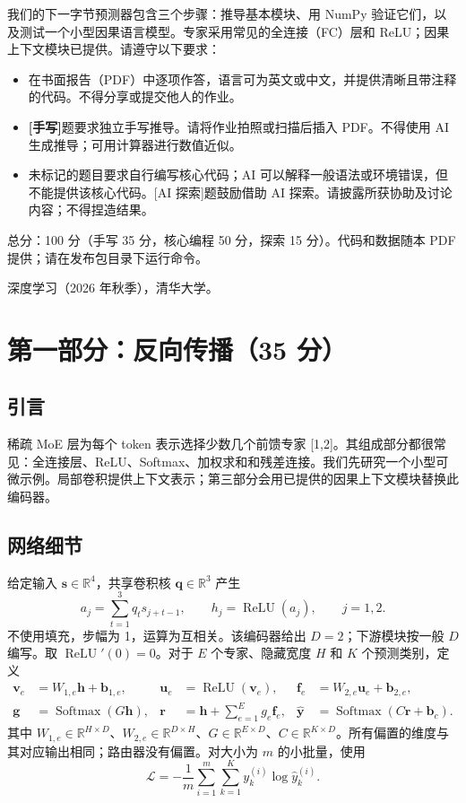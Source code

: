 \documentclass[UTF8,11pt,oneside]{ctexart}
\newcommand{\R}{\mathbb{R}}
\newcommand{\relu}{\operatorname{ReLU}}
\newcommand{\softmax}{\operatorname{Softmax}}
\newcommand{\Lcal}{\mathcal{L}}
\begin{document}
我们的下一字节预测器包含三个步骤：推导基本模块、用 NumPy 验证它们，以及测试一个小型因果语言模型。专家采用常见的全连接（FC）层和 ReLU；因果上下文模块已提供。请遵守以下要求：
\begin{itemize}
\item 在书面报告（PDF）中逐项作答，语言可为英文或中文，并提供清晰且带注释的代码。不得分享或提交他人的作业。
\item \textbf{[手写]}题要求独立手写推导。请将作业拍照或扫描后插入 PDF。不得使用 AI 生成推导；可用计算器进行数值近似。
\item 未标记的题目要求自行编写核心代码；AI 可以解释一般语法或环境错误，但不能提供该核心代码。[AI 探索]题鼓励借助 AI 探索。请披露所获协助及讨论内容；不得捏造结果。
\end{itemize}
总分：100 分（手写 35 分，核心编程 50 分，探索 15 分）。代码和数据随本 PDF 提供；请在发布包目录下运行命令。

\begin{center}\small 深度学习（2026 年秋季），清华大学。\end{center}

\clearpage
\section{第一部分：反向传播（35 分）}
\subsection{引言}
稀疏 MoE 层为每个 token 表示选择少数几个前馈专家 [1,2]。其组成部分都很常见：全连接层、ReLU、Softmax、加权求和和残差连接。我们先研究一个小型可微示例。局部卷积提供上下文表示；第三部分会用已提供的因果上下文模块替换此编码器。

\subsection{网络细节}
给定输入 $\bm{s}\in\R^4$，共享卷积核 $\bm{q}\in\R^3$ 产生
\begin{equation}
a_j=\sum_{t=1}^{3}q_t s_{j+t-1},\qquad h_j=\relu(a_j),\qquad j=1,2.\tag{1}
\end{equation}
不使用填充，步幅为 1，运算为互相关。该编码器给出 $D=2$；下游模块按一般 $D$ 编写。取 $\relu'(0)=0$。对于 $E$ 个专家、隐藏宽度 $H$ 和 $K$ 个预测类别，定义
\begin{align}
\bm{v}_e&=W_{1,e}\bm{h}+\bm{b}_{1,e}, & \bm{u}_e&=\relu(\bm{v}_e), & \bm{f}_e&=W_{2,e}\bm{u}_e+\bm{b}_{2,e}, \tag{2}\\
\bm{g}&=\softmax(G\bm{h}), & \bm{r}&=\bm{h}+\sum_{e=1}^{E}g_e\bm{f}_e, & \hat{\bm{y}}&=\softmax(C\bm{r}+\bm{b}_c). \tag{3}
\end{align}
其中 $W_{1,e}\in\R^{H\times D}$、$W_{2,e}\in\R^{D\times H}$、$G\in\R^{E\times D}$、$C\in\R^{K\times D}$。所有偏置的维度与其对应输出相同；路由器没有偏置。对大小为 $m$ 的小批量，使用
\begin{equation}
\Lcal=-\frac{1}{m}\sum_{i=1}^{m}\sum_{k=1}^{K}y_k^{(i)}\log\hat{y}_k^{(i)}.\tag{4}
\end{equation}
\end{document}
